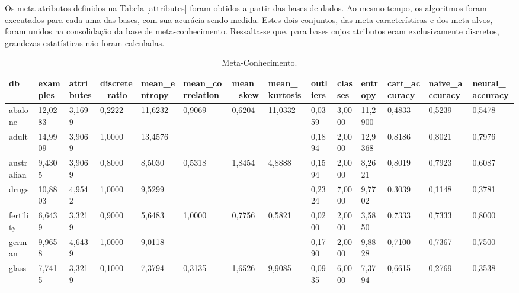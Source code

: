 \documentclass[runningheads]{llncs}
\begin{document}
Os meta-atributos definidos na Tabela \ref{attributes} foram obtidos a partir das bases de dados. Ao mesmo tempo, os algoritmos foram executados para cada uma das bases, com sua acurácia sendo medida. Estes dois conjuntos, das meta características e dos meta-alvos, foram unidos na consolidação da base de meta-conhecimento. Ressalta-se que, para bases cujos atributos eram exclusivamente discretos, grandezas estatísticas não foram calculadas.

\begin{table}[ht]
\centering
\caption{Meta-Conhecimento.}\label{knowledge}
\begin{adjustbox}{width=1\textwidth}
\small
\begin{tabular}{|l|l|l|l|l|l|l|l|l|l|l|l|l|l|}
\hline
db         & examples & attributes & discrete\_ratio & mean\_entropy & mean\_correlation & mean\_skew & mean\_kurtosis & outliers & classes & entropy & cart\_accuracy & naive\_accuracy & neural\_accuracy \\
\hline
abalone    & 12,0283  & 3,1699     & 0,2222          & 11,6232       & 0,9069            & 0,6204     & 11,0332        & 0,0359   & 3,0000  & 11,2900 & 0,4833         & 0,5239          & 0,5478           \\
adult      & 14,9909  & 3,9069     & 1,0000          & 13,4576       &                   &            &                & 0,1894   & 2,0000  & 12,9368 & 0,8186         & 0,8021          & 0,7976           \\
australian & 9,4305   & 3,9069     & 0,8000          & 8,5030        & 0,5318            & 1,8454     & 4,8888         & 0,1594   & 2,0000  & 8,2621  & 0,8019         & 0,7923          & 0,6087           \\
drugs      & 10,8803  & 4,9542     & 1,0000          & 9,5299        &                   &            &                & 0,2324   & 7,0000  & 9,7702  & 0,3039         & 0,1148          & 0,3781           \\
fertility  & 6,6439   & 3,3219     & 0,9000          & 5,6483        & 1,0000            & 0,7756     & 0,5821         & 0,0200   & 2,0000  & 3,5850  & 0,7333         & 0,7333          & 0,8000           \\
german     & 9,9658   & 4,6439     & 1,0000          & 9,0118        &                   &            &                & 0,1790   & 2,0000  & 9,8828  & 0,7100         & 0,7367          & 0,7500           \\
glass      & 7,7415   & 3,3219     & 0,1000          & 7,3794        & 0,3135            & 1,6526     & 9,9085         & 0,0935   & 6,0000  & 7,3794  & 0,6615         & 0,2769          & 0,3538           \\

\end{tabular}
\end{adjustbox}
\end{table}
\end{document}
